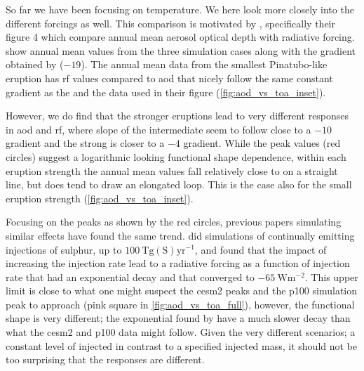 \documentclass[twocol]{ametsocV5}
\newcommand{\iso}[1][i]{{#1}njected \ce{SO2}}
\begin{document}
So far we have been focusing on temperature. We here look more closely into the
different forcings as well. This comparison is motivated by \citet{gregory2016},
specifically their figure 4 which compare annual mean aerosol optical depth with
radiative forcing.  show annual mean values from the three
simulation cases along with the gradient obtained by \citet{gregory2016} (\(-19\)). The
annual mean data from the smallest Pinatubo-like eruption has \acrshort{rf} values
compared to \acrshort{aod} that nicely follow the same constant gradient as the
\citet{gregory2016} and the data used in their figure (\cref{fig:aod_vs_toa_inset}).

However, we do find that the stronger eruptions lead to very different responses in
\acrshort{aod} and \acrshort{rf}, where slope of the intermediate seem to follow close
to a \( -10 \) gradient and the strong is closer to a \( -4 \) gradient. While the peak
values (red circles) suggest a logarithmic looking functional shape dependence, within
each eruption strength the annual mean values fall relatively close to on a straight
line, but does tend to draw an elongated loop. This is the case also for the small
eruption strength (\cref{fig:aod_vs_toa_inset}).

Focusing on the peaks as shown by the red circles, previous papers simulating similar
effects have found the same trend. \citet{niemeier2015} did simulations of continually
emitting injections of sulphur, up to \( \SI{100}{\tera\gram
  \mathrm{(S)}\mathrm{yr}^{-1}} \), and found that the impact of increasing the injection
rate lead to a radiative forcing as a function of injection rate that had an exponential
decay and that converged to \( \SI{-65}{\watt\meter^{-2}} \). This upper limit is close
to what one might suspect the \acrshort{cesm2} peaks and the \acrfull{p100} simulation
peak to approach (pink square in \cref{fig:aod_vs_toa_full}), however, the functional
shape is very different; the exponential found by \citet{niemeier2015} have a much
slower decay than what the \acrshort{cesm2} and \acrshort{p100} data might follow. Given
the very different scenarios; a constant level of \iso{} in contrast to a specified
injected mass, it should not be too surprising that the responses are different.
\end{document}
